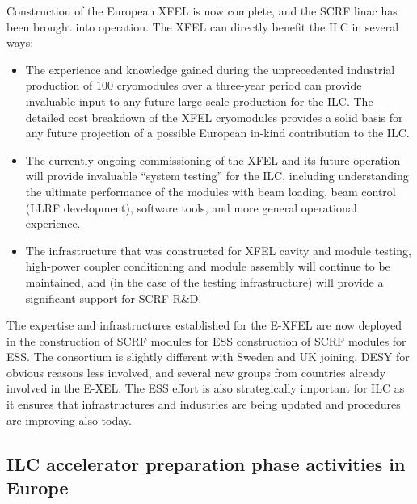 \documentclass[%
 reprint,
 amsmath,amssymb,
 aps,
]{revtex4-1}
\begin{document}
Construction of the European XFEL is now complete, and the SCRF linac has been brought into operation. The XFEL can directly benefit the ILC in several ways: 
\begin{itemize}
\item The experience and knowledge gained during the unprecedented industrial
production of 100 cryomodules over a three-year period can provide 
invaluable input to any future large-scale production for the ILC. The detailed cost breakdown of the XFEL cryomodules provides a solid basis for any future projection of a possible European in-kind contribution to the ILC. 
\item 
The currently ongoing commissioning of the XFEL and its future operation will provide invaluable ``system testing'' for the ILC, including understanding the ultimate performance of the modules with beam loading, beam control (LLRF development), software tools, and more general operational experience. 
\item The infrastructure that was constructed for XFEL cavity and module 
testing, high-power coupler conditioning and module assembly will continue to be maintained, and (in the case of the testing infrastructure) will provide a significant support for SCRF R\&D.
\end{itemize}

The expertise and infrastructures established for the E-XFEL are now deployed in the construction of SCRF modules for ESS construction of SCRF modules for ESS. The consortium is slightly different with Sweden and UK joining, DESY for obvious reasons less involved, and several new groups from countries already involved in the E-XEL. The ESS effort is also strategically important for ILC as it ensures that infrastructures and industries are being updated and procedures are improving also today.

\subsection{ILC accelerator preparation phase activities in Europe ~\label{sec:prepphase:accelerator}}
\end{document}
